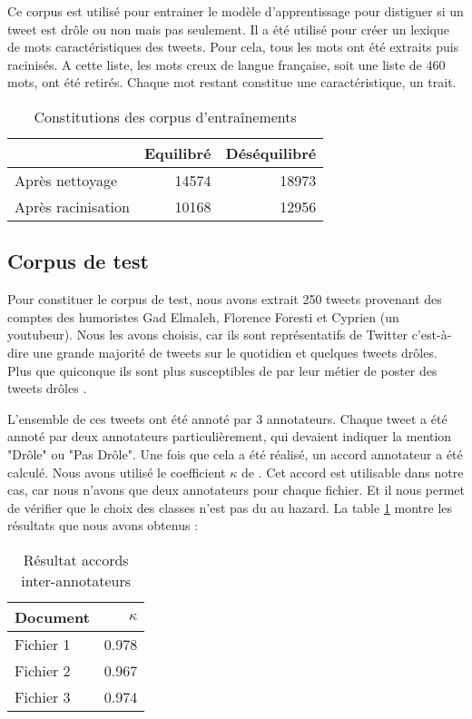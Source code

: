 \documentclass[10pt,a4paper,twoside]{article}
\begin{document}
Ce corpus est utilisé pour entrainer le modèle d'apprentissage pour distiguer si un tweet est drôle ou non mais pas seulement. Il a été utilisé pour créer un lexique de mots caractéristiques des tweets. Pour cela, tous les mots ont été extraits puis racinisés. A cette liste, les mots creux de langue française, soit une liste de 460 mots, ont été retirés. Chaque mot restant constitue une caractéristique, un trait.



\begin{table}[!h]
\centering
	\begin{tabular}{lrr}
	\toprule
	& Equilibré & Déséquilibré \\
	\midrule
	 Après nettoyage & 14574 & 18973 \\
	 Après racinisation & 10168 & 12956 \\
	\bottomrule
	\end{tabular}
\caption{Constitutions des corpus d'entraînements}
\end{table}

\subsection{Corpus de test} 
Pour constituer le corpus de test, nous avons extrait 250 tweets provenant des comptes des humoristes Gad Elmaleh, Florence Foresti et Cyprien (un youtubeur). Nous les avons choisis, car ils sont représentatifs de Twitter c'est-à-dire une grande majorité de tweets sur le quotidien et quelques tweets drôles. Plus que quiconque ils sont plus susceptibles de par leur métier de poster des tweets drôles .

L'ensemble de ces tweets ont été annoté par 3 annotateurs. Chaque tweet a été annoté par deux annotateurs particulièrement, qui devaient indiquer la mention "Drôle" ou "Pas Drôle". Une fois que cela a été réalisé, un accord annotateur a été calculé. Nous avons utilisé le coefficient $\kappa$ de \cite{cohen1960}. Cet accord est utilisable dans notre cas, car nous n'avons que deux annotateurs pour chaque fichier. Et il nous permet de vérifier que le choix des classes n'est pas du au hazard. La table \ref{anno} montre les résultats que nous avons obtenus :

\begin{table}[!h]
\centering
	\begin{tabular}{lr}
	\toprule
	 Document & $\kappa$ \\
	\midrule
	  Fichier 1 & 0.978 \\
	  Fichier 2 &  0.967\\
	  Fichier 3 & 0.974  \\
	\bottomrule
	\end{tabular}
\caption{Résultat accords inter-annotateurs}
\label{anno}
\end{table}
\end{document}
